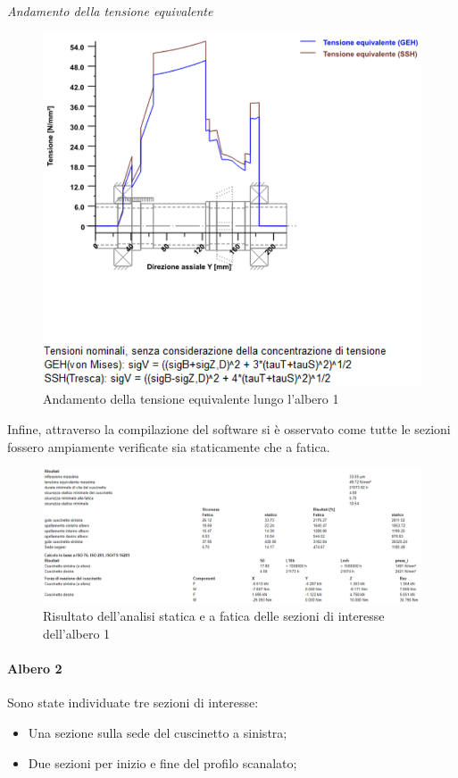 \emph{Andamento della tensione equivalente}
\begin{figure}[h]
    \centering
    \includegraphics[scale=0.6]{Immagini/TensioniAlbero1.png}
    \caption{Andamento della tensione equivalente lungo l'albero 1}
    \label{fig:TensioniAlbero1}
\end{figure}
\newpage
Infine, attraverso la compilazione del software si è osservato come tutte le sezioni fossero ampiamente verificate sia staticamente che a fatica.
\begin{figure}[h]
    \centering
    \includegraphics[scale=0.4]{Immagini/RisultatiAlbero1.png}
    \caption{Risultato dell'analisi statica e a fatica delle sezioni di interesse dell'albero 1}
    \label{fig:RisultatiALbero1}
\end{figure}

\paragraph{Albero 2}
Sono state individuate tre sezioni di interesse:
\begin{itemize}
    \item Una sezione sulla sede del cuscinetto a sinistra;
    \item Due sezioni per inizio e fine del profilo scanalato;
\end{itemize}

